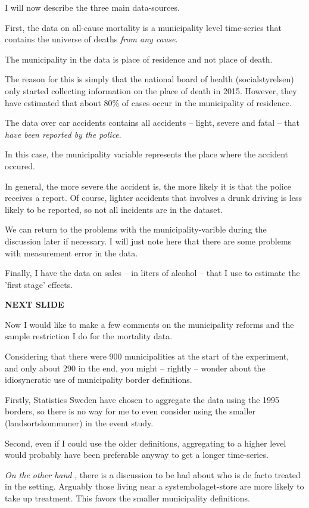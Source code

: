 \documentclass[12pt]{article}
\begin{document}
I  will now describe the three main data-sources.

First, the data on all-cause mortality is a municipality level time-series that contains the universe of deaths \emph{from any cause}. 

The municipality in the data is place of residence and not place of death. 

The reason for this is simply that the national board of health (socialstyrelsen) only started collecting information on the place of death in 2015. However, they have estimated that about 80\% of cases occur in the municipality of residence.

The data over car accidents contains all accidents -- light, severe and fatal -- that \emph{have been reported by the police}. 

In this case, the municipality variable represents the place where the accident occured. 

In general, the more severe the accident is, the more likely it is that the police receives a report. Of course, lighter accidents that involves a drunk driving is less likely to be reported, so not all incidents are in the dataset.

We can return to the problems with the municipality-varible during the discussion later if necessary. I will just note here that there are some problems with measurement error in the data.

Finally, I have the data on sales -- in liters of alcohol -- that I use to estimate the 'first stage' effects.

 \textbf{NEXT SLIDE}

 Now I would like to make a few comments on the municipality reforms and the sample restriction I do for the mortality data. 

 Considering that there were 900 municipalities at the start of the experiment, and only about 290 in the end, you might -- rightly -- wonder about the idiosyncratic use of municipality border definitions. 

Firstly, Statistics Sweden have chosen to aggregate the data using the 1995 borders, so there is no way for me to even consider using the smaller (landsortskommuner) in the event study. 

Second, even if I could use the older definitions, aggregating to a higher level would probably have been preferable anyway to get a longer time-series. 

\emph{On the other hand} , there is a discussion to be had about who is de facto treated in the setting. Arguably those living near a systembolaget-store are more likely to take up treatment. This favors the smaller municipality definitions. 
\end{document}
